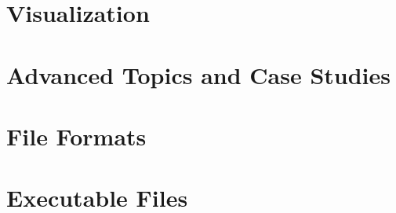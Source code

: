 \documentclass[pdf,oneside]{book}
\newif\ifEPAReport
\begin{document}
  \chapter{Visualization}
  \label{chap:visualization}
  

  \chapter{Advanced Topics and Case Studies}
  \label{part2}
  
  
  \chapter{File Formats}
  \label{fileFormats} 
  
  
  \chapter{Executable Files}
  \label{appendixExecutables}
  
  
  
  \renewcommand{\bibname}{References}
  

  \newpage
  \ifEPAReport
    
  \else
    
    
    
  \fi

  
\end{document}
